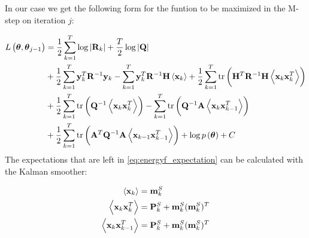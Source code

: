 \documentclass[12pt,a4paper,oneside,article]{memoir}
\begin{document}
In our case we get the following form for the funtion to be maximized in the
M-step on iteration $j$:

\begin{align}
	L\left(\gv{\theta},\gv{\theta}_{j-1}\right)&=
	\frac{1}{2}\sum_{k=1}^T\log\abbs{\v{R}_k}+\frac{T}{2}\log\abbs{\v{Q}}\\
	&+\frac{1}{2}\sum_{k=1}^T\v{y}_k^T\v{R}^{-1}\v{y}_k
	-\sum_{k=1}^T\v{y}_k^T\v{R}^{-1}\v{H}\E{\v{x}_k}
	+\frac{1}{2}\sum_{k=1}^T\mathrm{tr}\left(\v{H}^T\v{R}^{-1}\v{H}\E{\v{x}_k\v{x}_k^T}\right)\\
	&+\frac{1}{2}\sum_{k=1}^T\mathrm{tr}\left(\v{Q}^{-1}\E{\v{x}_k\v{x}_k^T}\right)
	-\sum_{k=1}^T\mathrm{tr}\left(\v{Q}^{-1}\v{A}\E{\v{x}_k\v{x}_{k-1}^T}\right)\\
	&+\frac{1}{2}\sum_{k=1}^T\mathrm{tr}\left(\v{A}^T\v{Q}^{-1}\v{A}\E{\v{x}_{k-1}\v{x}_{k-1}^T}\right)
	+\log\Pdf{\gv{\theta}}+C
	\label{eq:energyf_expectation}
\end{align}
The expectations that are left in \eqref{eq:energyf_expectation} can be
calculated with the Kalman smoother:

\begin{align}
	\left<\mathbf{x}_k\right>&=\mathbf{m}_k^S\\
	\left<\mathbf{x}_k\mathbf{x}_k^T\right>&=\mathbf{P}_k^S+\mathbf{m}_k^S(\mathbf{m}_k^S)^T\\
	\left<\mathbf{x}_k\mathbf{x}_{k-1}^T\right>&=\mathbf{P}_k^S+\mathbf{m}_k^S(\mathbf{m}_k^S)^T
\end{align}
\end{document}
